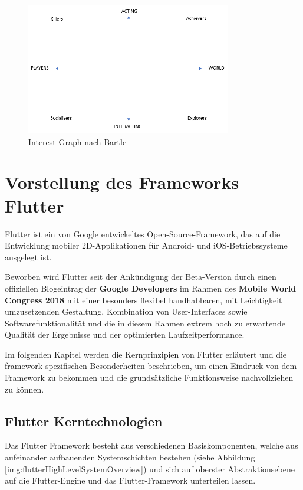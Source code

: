 \documentclass[bibliography=totoc,listof=totoc,BCOR=5mm,DIV=12,oneside]{scrbook}
\begin{document}
\begin{figure}[H]
	\centering
	\includegraphics[width=0.8\textwidth, keepaspectratio]{Bilder/Diagramme/InterestGraphBartle.png}
	\caption{Interest Graph nach Bartle \cite{bartle1996hearts}}
	\label{img:interetGraphBartle}
\end{figure}

\newpage
\section{Vorstellung des Frameworks Flutter}
\par Flutter ist ein von Google entwickeltes Open-Source-Framework, das auf die Entwicklung mobiler 2D-Applikationen für Android- und iOS-Betriebssysteme ausgelegt ist. 
\par \medskip Beworben wird Flutter seit der Ankündigung der Beta-Version durch einen offiziellen Blogeintrag der \textbf{Google Developers}\citep{AnouncingFlutterBeta} im Rahmen des \textbf{Mobile World Congress 2018}\citep{MobileWordCongress} mit einer besonders flexibel handhabbaren, mit Leichtigkeit umzusetzenden Gestaltung, Kombination von User-Interfaces sowie Softwarefunktionalität und die in diesem Rahmen extrem hoch zu erwartende Qualität der Ergebnisse und der optimierten Laufzeitperformance. 

\par \medskip Im folgenden Kapitel werden die Kernprinzipien von Flutter erläutert und die framework-spezifischen Besonderheiten beschrieben, um einen Eindruck von dem Framework zu bekommen und die grundsätzliche Funktionsweise nachvollziehen zu können.

\subsection{Flutter Kerntechnologien} 
Das Flutter Framework besteht aus verschiedenen Basiskomponenten, welche aus aufeinander aufbauenden Systemschichten bestehen (siehe Abbildung \ref{img:flutterHighLevelSystemOverview}) und sich auf oberster Abstraktionsebene auf die Flutter-Engine und das Flutter-Framework unterteilen lassen.
\end{document}
